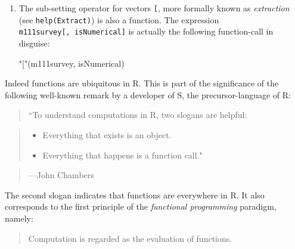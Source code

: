 \documentclass[]{book}
\makeatletter
\newenvironment{Shaded}{\begin{snugshade}}{\end{snugshade}}
\newcommand{\DecValTok}[1]{\textcolor[rgb]{0.00,0.00,0.81}{{#1}}}
\newcommand{\StringTok}[1]{\textcolor[rgb]{0.31,0.60,0.02}{{#1}}}
\newcommand{\CommentTok}[1]{\textcolor[rgb]{0.56,0.35,0.01}{\textit{{#1}}}}
\newcommand{\NormalTok}[1]{{#1}}
\providecommand{\tightlist}{%
  \setlength{\itemsep}{0pt}\setlength{\parskip}{0pt}}
\newenvironment{kframe}{%
\medskip{}
\setlength{\fboxsep}{.8em}
 \def\at@end@of@kframe{}%
 \ifinner\ifhmode%
  \def\at@end@of@kframe{\end{minipage}}%
  \begin{minipage}{\columnwidth}%
 \fi\fi%
 \def\FrameCommand##1{\hskip\@totalleftmargin \hskip-\fboxsep
 \colorbox{shadecolor}{##1}\hskip-\fboxsep
     \hskip-\linewidth \hskip-\@totalleftmargin \hskip\columnwidth}%
 \MakeFramed {\advance\hsize-\width
   \@totalleftmargin\z@ \linewidth\hsize
   \@setminipage}}%
 {\par\unskip\endMakeFramed%
 \at@end@of@kframe}
\renewenvironment{Shaded}{\begin{kframe}}{\end{kframe}}
\theoremstyle{definition}
\theoremstyle{definition}
\theoremstyle{remark}
\makeatother
\begin{document}
{\begin{enumerate}
  Thus, to assign the value 3 to that variable \texttt{a} one could
  write:

\begin{Shaded}
\begin{Highlighting}[]
\StringTok{"<-"}\NormalTok{(a, }\DecValTok{3}\NormalTok{)}
\NormalTok{a   }\CommentTok{# check that a is really 3}
\end{Highlighting}
\end{Shaded}

\begin{verbatim}
## [1] 3
\end{verbatim}
\item
  The sub-setting operator for vectors \texttt{{[}}, more formally known
  as \emph{extraction} (see \texttt{help(Extract)}) is also a function.
  The expression \texttt{m111survey{[},\ isNumerical{]}} is actually the
  following function-call in disguise:

\begin{Shaded}
\begin{Highlighting}[]
\StringTok{"["}\NormalTok{(m111survey, isNumerical)}
\end{Highlighting}
\end{Shaded}
\end{enumerate}

Indeed functions are ubiquitous in R. This is part of the significance
of the following well-known remark by a developer of S, the
precursor-language of R:

\begin{quote}
``To understand computations in R, two slogans are helpful:
\end{quote}

\begin{quote}
\begin{itemize}
\tightlist
\item
  Everything that exists is an object.
\item
  Everything that happens is a function call."
\end{itemize}
\end{quote}

\begin{quote}
---John Chambers
\end{quote}

The second slogan indicates that functions are everywhere in R. It also
corresponds to the first principle of the \emph{functional programming}
paradigm, namely:

\begin{quote}
Computation is regarded as the evaluation of functions.
\end{quote}

}
\end{document}
